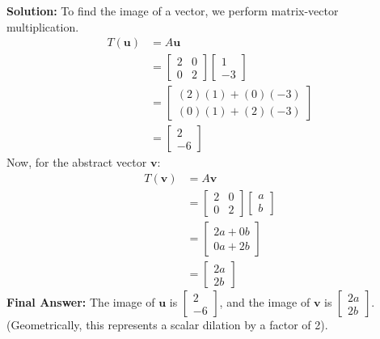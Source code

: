 \documentclass[11pt]{article}
\begin{document}
\textbf{Solution:}
To find the image of a vector, we perform matrix-vector multiplication.
\begin{align*}
    T(\mathbf{u}) &= A\mathbf{u} \\
    &= \begin{bmatrix} 2 & 0 \\ 0 & 2 \end{bmatrix} \begin{bmatrix} 1 \\ -3 \end{bmatrix} \\
    &= \begin{bmatrix} (2)(1) + (0)(-3) \\ (0)(1) + (2)(-3) \end{bmatrix} \\
    &= \begin{bmatrix} 2 \\ -6 \end{bmatrix}
\end{align*}
Now, for the abstract vector $\mathbf{v}$:
\begin{align*}
    T(\mathbf{v}) &= A\mathbf{v} \\
    &= \begin{bmatrix} 2 & 0 \\ 0 & 2 \end{bmatrix} \begin{bmatrix} a \\ b \end{bmatrix} \\
    &= \begin{bmatrix} 2a + 0b \\ 0a + 2b \end{bmatrix} \\
    &= \begin{bmatrix} 2a \\ 2b \end{bmatrix}
\end{align*}
\textbf{Final Answer:} The image of $\mathbf{u}$ is $\begin{bmatrix} 2 \\ -6 \end{bmatrix}$, and the image of $\mathbf{v}$ is $\begin{bmatrix} 2a \\ 2b \end{bmatrix}$. (Geometrically, this represents a scalar dilation by a factor of 2).
\end{document}
